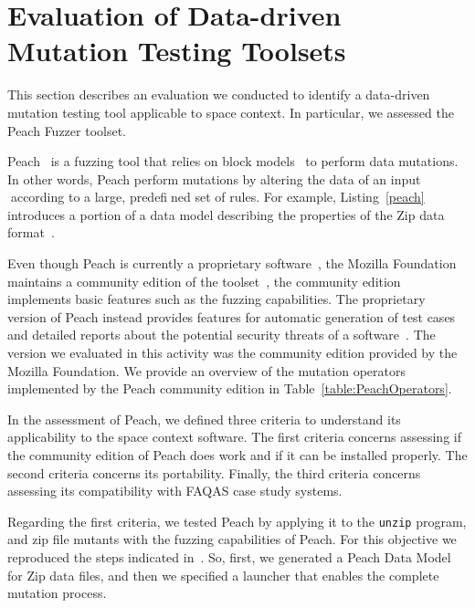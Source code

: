 \clearpage
\section{Evaluation of Data-driven Mutation Testing Toolsets}
\label{sec:toolsComparisonDataDriven}

This section describes an evaluation we conducted to identify a data-driven mutation testing tool applicable to space context. In particular, we assessed the Peach Fuzzer toolset.






Peach~\cite{PeachMozilla,PeachFuzzer} is a fuzzing tool that relies on block models~\cite{pham2016model,spike} to perform data mutations. In other words, Peach perform mutations by altering the data of an input 􏰘according to a large, predefi􏰘ned set of rules. For example, Listing~\ref{peach} introduces a portion of a data model describing the properties of the Zip data format~\cite{zipformat}. 

Even though Peach is currently a proprietary software~\cite{PeachFuzzer}, the Mozilla Foundation maintains a community edition of the toolset~\cite{PeachMozilla}, the community edition implements basic features such as the fuzzing capabilities. The proprietary version of Peach instead provides features for automatic generation of test cases and detailed reports about the potential security threats of a software~\cite{PeachFuzzer}. The version we evaluated in this activity was the community edition provided by the Mozilla Foundation. We provide an overview of the mutation operators implemented by the Peach community edition in Table~\ref{table:PeachOperators}.


In the assessment of Peach, we defined three criteria to understand its applicability to the space context software. The first criteria concerns assessing if the community edition of Peach does work and if it can be installed properly. The second criteria concerns its portability. Finally, the third criteria concerns assessing its compatibility with FAQAS case study systems.

Regarding the first criteria, we tested Peach by applying it to the \texttt{unzip} program, and zip file mutants with the fuzzing capabilities of Peach. For this objective we reproduced the steps indicated in~\cite{zipexample}. So, first, we generated a Peach Data Model for Zip data files, and then we specified a launcher that enables the complete mutation process.

